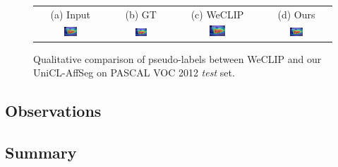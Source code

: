 \begin{figure}[ht]
  \begin{tabular}{cccc}
    (a) Input                                                                                       & (b) GT & (c) WeCLIP & (d) Ours \\

    \includegraphics[width=0.20\textwidth]{figures/qualitative_analysis/test_cam/2010_005860_6.jpg} &
    \includegraphics[width=0.20\textwidth]{figures/qualitative_analysis/test_cam/2010_005860_6.jpg} &
    \includegraphics[width=0.20\textwidth]{figures/qualitative_analysis/test_cam/2010_005860_6.jpg} &
    \includegraphics[width=0.20\textwidth]{figures/qualitative_analysis/test_cam/2010_005860_6.jpg}                                  \\
  \end{tabular}

  \caption{Qualitative comparison of pseudo-labels between WeCLIP and our UniCL-AffSeg on PASCAL VOC 2012 \textit{test} set.}
  \label{fig:qualitative_comparison_pseudolabel_test}
\end{figure}


\subsection{Observations}


\subsection{Summary}
